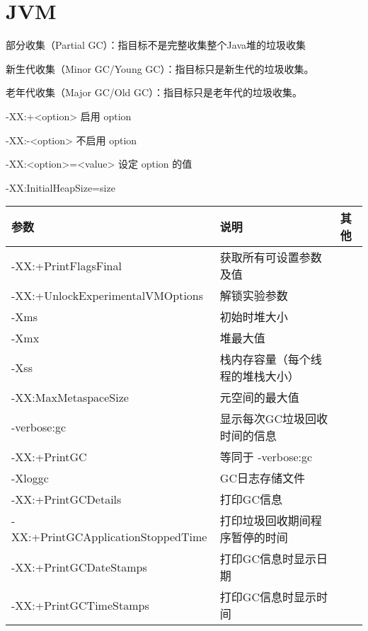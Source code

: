 \chapter{JVM}
\label{chap:JVM}


部分收集（Partial GC）：指目标不是完整收集整个Java堆的垃圾收集

新生代收集（Minor GC/Young GC）：指目标只是新生代的垃圾收集。

老年代收集（Major GC/Old GC）：指目标只是老年代的垃圾收集。

-XX:+<option>               启用 option

-XX:-<option>               不启用 option

-XX:<option>=<value>        设定 option 的值

-XX:InitialHeapSize=size

\renewcommand\arraystretch{2}
\begin{tabular}{l|l|l}
           参数                          &      说明                        &     其他       \\               \hline
    -XX:+PrintFlagsFinal                &       获取所有可设置参数及值        &                \\
    -XX:+UnlockExperimentalVMOptions    &       解锁实验参数                &                \\
    -Xms                                &       初始时堆大小                &                \\
    -Xmx                                &       堆最大值                   &                \\
    -Xss                                &   栈内存容量（每个线程的堆栈大小）   &                \\
    -XX:MaxMetaspaceSize                &   元空间的最大值                  &                \\
    -verbose:gc                         &   显示每次GC垃圾回收时间的信息      &                \\
    -XX:+PrintGC                        &   等同于 -verbose:gc             &                \\
    -Xloggc                             &   GC日志存储文件                  &                   \\
    -XX:+PrintGCDetails                 &   打印GC信息                     &                    \\
    -XX:+PrintGCApplicationStoppedTime  &   打印垃圾回收期间程序暂停的时间     &                    \\
    -XX:+PrintGCDateStamps              &   打印GC信息时显示日期             &                    \\
    -XX:+PrintGCTimeStamps              &   打印GC信息时显示时间             &                    \\
\end{tabular}\newline



